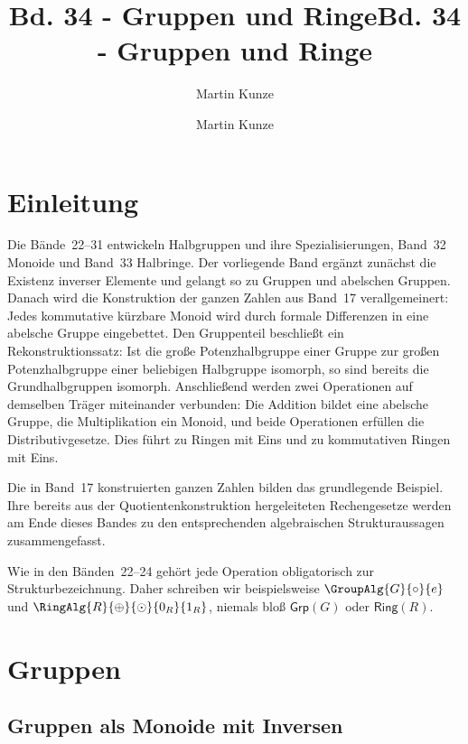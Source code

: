 \documentclass[main.tex]{subfiles}
\title{Bd. 34 - Gruppen und Ringe}
\author{Martin Kunze}
\date{}
\begin{document}
\newcommand{\BandXXIXProofRefStack}[1]{%
  \ensuremath{\begin{gathered}#1\end{gathered}}}

\title{Bd. 34 - Gruppen und Ringe}
\author{Martin Kunze}
\date{}
\hypersetup{pageanchor=false}
\maketitle
\hypersetup{pageanchor=true}
\setcounter{tocdepth}{3}
\tableofcontents
\setcounter{file}{34}
\renewcommand{\FormulaBandID}{34}

\chapter{Einleitung}

Die Bände~22--31 entwickeln Halbgruppen und ihre Spezialisierungen,
Band~32 Monoide und Band~33 Halbringe.
Der vorliegende Band ergänzt zunächst die Existenz inverser Elemente und
gelangt so zu Gruppen und abelschen Gruppen. Danach wird die Konstruktion
der ganzen Zahlen aus Band~17 verallgemeinert: Jedes kommutative kürzbare
Monoid wird durch formale Differenzen in eine abelsche Gruppe eingebettet.
Den Gruppenteil beschließt ein Rekonstruktionssatz: Ist die große
Potenzhalbgruppe einer Gruppe zur großen Potenzhalbgruppe einer beliebigen
Halbgruppe isomorph, so sind bereits die Grundhalbgruppen isomorph.
Anschließend werden zwei Operationen auf demselben Träger miteinander
verbunden: Die Addition bildet eine abelsche Gruppe, die Multiplikation ein
Monoid, und beide Operationen erfüllen die Distributivgesetze. Dies führt zu
Ringen mit Eins und zu kommutativen Ringen mit Eins.

Die in Band~17 konstruierten ganzen Zahlen bilden das grundlegende Beispiel.
Ihre bereits aus der Quotientenkonstruktion hergeleiteten Rechengesetze
werden am Ende dieses Bandes zu den entsprechenden algebraischen
Strukturaussagen zusammengefasst.

Wie in den Bänden~22--24 gehört jede Operation obligatorisch zur
Strukturbezeichnung. Daher schreiben wir beispielsweise
\(\GroupAlg{G}{\circ}{e}\) und
\(\RingAlg{R}{\oplus}{\odot}{0_R}{1_R}\), niemals bloß
\(\mathsf{Grp}(G)\) oder \(\mathsf{Ring}(R)\).

\chapter{Gruppen}

\section{Gruppen als Monoide mit Inversen}
\end{document}
